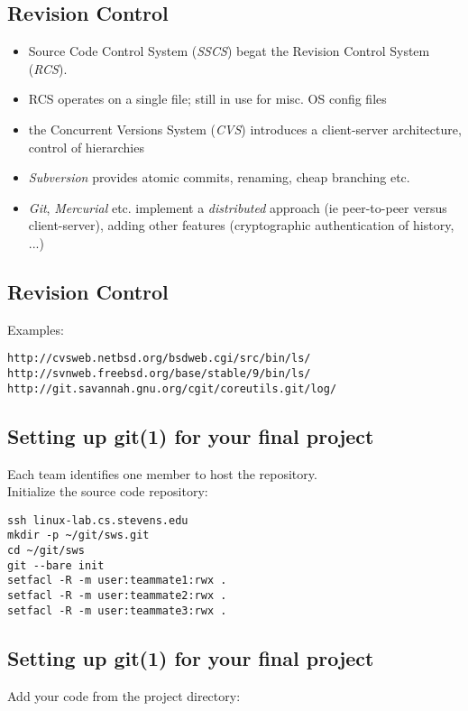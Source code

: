 \documentclass[xga]{xdvislides}
\begin{document}
\subsection{Revision Control}
\begin{itemize}
	\item Source Code Control System ({\em SSCS}) begat the Revision
		Control System ({\em RCS}).
	\item RCS operates on a single file; still in use for misc. OS
		config files
	\item the Concurrent Versions System ({\em CVS}) introduces a
		client-server architecture, control of hierarchies
	\item {\em Subversion} provides atomic commits, renaming, cheap
		branching etc.
	\item {\em Git}, {\em Mercurial} etc. implement a {\em
		distributed} approach (ie peer-to-peer versus
		client-server), adding other features (cryptographic
		authentication of history, ...)
\end{itemize}

\subsection{Revision Control}
Examples:

{\tt http://cvsweb.netbsd.org/bsdweb.cgi/src/bin/ls/} \\

{\tt http://svnweb.freebsd.org/base/stable/9/bin/ls/} \\

{\tt http://git.savannah.gnu.org/cgit/coreutils.git/log/}

\subsection{Setting up git(1) for your final project}
Each team identifies one member to host the repository. \\

Initialize the source code repository:
\\

\begin{verbatim}
ssh linux-lab.cs.stevens.edu
mkdir -p ~/git/sws.git
cd ~/git/sws
git --bare init
setfacl -R -m user:teammate1:rwx .
setfacl -R -m user:teammate2:rwx .
setfacl -R -m user:teammate3:rwx .
\end{verbatim}

\subsection{Setting up git(1) for your final project}
Add your code from the project directory:
\\
\end{document}
